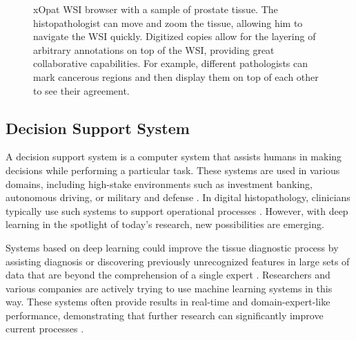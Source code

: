 \begin{figure}[t]
    \centering
    \caption{xOpat \cite{xopat} WSI browser with a sample of prostate tissue. The histopathologist can move and zoom the tissue, allowing him to navigate the WSI quickly. Digitized copies allow for the layering of arbitrary annotations on top of the WSI, providing great collaborative capabilities. For example, different pathologists can mark cancerous regions and then display them on top of each other to see their agreement.}
    \label{fig:xopat}
\end{figure}

\subsection*{Decision Support System}

A decision support system is a computer system that assists humans in making decisions while performing a particular task.
These systems are used in various domains, including high-stake environments such as investment banking, autonomous driving, or military and defense \cite{dss-finance, dss-autonomous-driving, dss-military-and-defense}.
In digital histopathology, clinicians typically use such systems to support operational processes \cite{digital-histopathology-process}.
However, with deep learning in the spotlight of today's research, new possibilities are emerging.

Systems based on deep learning could improve the tissue diagnostic process by assisting diagnosis or discovering previously unrecognized features in large sets of data that are beyond the comprehension of a single expert \cite{dss-digital-histopathology}. 
Researchers and various companies are actively trying to use machine learning systems in this way. 
These systems often provide results in real-time and domain-expert-like performance, demonstrating that further research can significantly improve current processes \cite{deep-learning-in-histopathology}.

